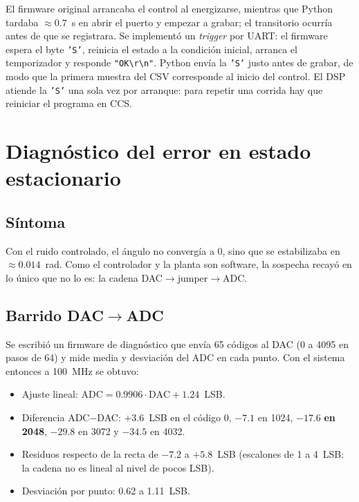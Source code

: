 \documentclass[11pt,a4paper]{article}
\begin{document}
El firmware original arrancaba el control al energizarse, mientras que Python tardaba $\approx 0.7$~s en abrir el puerto y empezar a grabar; el transitorio ocurría antes de que se registrara. Se implementó un \emph{trigger} por UART: el firmware espera el byte \texttt{'S'}, reinicia el estado a la condición inicial, arranca el temporizador y responde \texttt{"OK\textbackslash r\textbackslash n"}. Python envía la \texttt{'S'} justo antes de grabar, de modo que la primera muestra del CSV corresponde al inicio del control. El DSP atiende la \texttt{'S'} una sola vez por arranque: para repetir una corrida hay que reiniciar el programa en CCS.

\section{Diagnóstico del error en estado estacionario}
\label{sec:estacionario}

\subsection{Síntoma}

Con el ruido controlado, el ángulo no convergía a 0, sino que se estabilizaba en $\approx 0.014$~rad. Como el controlador y la planta son software, la sospecha recayó en lo único que no lo es: la cadena DAC$\rightarrow$jumper$\rightarrow$ADC.

\subsection{Barrido DAC$\rightarrow$ADC}
\label{sec:barrido}

Se escribió un firmware de diagnóstico que envía 65 códigos al DAC (0 a 4095 en pasos de 64) y mide media y desviación del ADC en cada punto. Con el sistema entonces a 100~MHz se obtuvo:

\begin{itemize}
    \item Ajuste lineal: $\text{ADC}=0.9906\cdot\text{DAC}+1.24$~LSB.
    \item Diferencia ADC$-$DAC: $+3.6$~LSB en el código 0, $-7.1$ en 1024, $\mathbf{-17.6}$ \textbf{en 2048}, $-29.8$ en 3072 y $-34.5$ en 4032.
    \item Residuos respecto de la recta de $-7.2$ a $+5.8$~LSB (escalones de 1 a 4~LSB: la cadena no es lineal al nivel de pocos LSB).
    \item Desviación por punto: 0.62 a 1.11~LSB.
\end{itemize}
\end{document}
